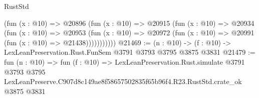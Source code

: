 \begin{lexlean}{RustStd}
\begin{coremodule}
            (fun (x : @10) =>
            @20896
              (fun (x : @10) =>
              @20915
                (fun (x : @10) =>
                @20934
                  (fun (x : @10) =>
                  @20953
                    (fun (x : @10) =>
                    @20972 (fun (x : @10) => @20991 (fun (x : @10) => @21438)))))))))))
@21469 := (n : @10) -> (f : @10) -> LexLeanPreservation.Rust.FunSem @3791 @3793 @3795 @3875 @3831
@21479 := fun (n : @10) =>
  fun (f : @10) =>
  LexLeanPreservation.Rust.simulate
    @3791
    @3793
    @3795
    LexLeanPreserve.C907d8c149ae8f58657502835f65b96f4.R23.RustStd.crate_ok
    @3875
    @3831
\end{coremodule}
\end{lexlean}
